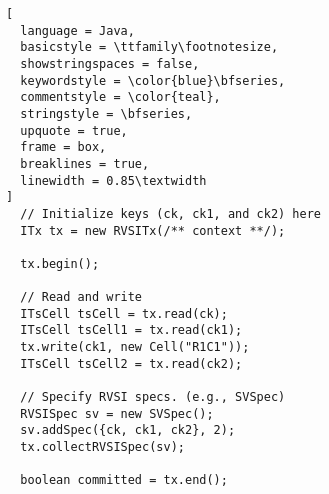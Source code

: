 \begin{lstlisting}[
  language = Java,
  basicstyle = \ttfamily\footnotesize,
  showstringspaces = false,
  keywordstyle = \color{blue}\bfseries,
  commentstyle = \color{teal},
  stringstyle = \bfseries,
  upquote = true,
  frame = box,
  breaklines = true,
  linewidth = 0.85\textwidth
]
  // Initialize keys (ck, ck1, and ck2) here
  ITx tx = new RVSITx(/** context **/);

  tx.begin();

  // Read and write
  ITsCell tsCell = tx.read(ck);
  ITsCell tsCell1 = tx.read(ck1);
  tx.write(ck1, new Cell("R1C1"));
  ITsCell tsCell2 = tx.read(ck2);

  // Specify RVSI specs. (e.g., SVSpec)
  RVSISpec sv = new SVSpec();
  sv.addSpec({ck, ck1, ck2}, 2);
  tx.collectRVSISpec(sv);

  boolean committed = tx.end();
\end{lstlisting}

